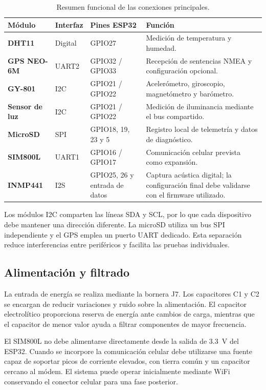 \documentclass[11pt,a4paper]{article}
\begin{document}
\begin{table}[H]
\centering
\caption{Resumen funcional de las conexiones principales.}
\begin{tabularx}{0.98\textwidth}{>{\bfseries}p{3.0cm} p{3.0cm} p{3.0cm} X}
\toprule
Módulo & Interfaz & Pines ESP32 & Función \\
\midrule
DHT11 & Digital & GPIO27 & Medición de temperatura y humedad. \\
GPS NEO-6M & UART2 & GPIO32 / GPIO33 & Recepción de sentencias NMEA y configuración opcional. \\
GY-801 & I2C & GPIO21 / GPIO22 & Acelerómetro, giroscopio, magnetómetro y barómetro. \\
Sensor de luz & I2C & GPIO21 / GPIO22 & Medición de iluminancia mediante el bus compartido. \\
MicroSD & SPI & GPIO18, 19, 23 y 5 & Registro local de telemetría y datos de diagnóstico. \\
SIM800L & UART1 & GPIO16 / GPIO17 & Comunicación celular prevista como expansión. \\
INMP441 & I2S & GPIO25, 26 y entrada de datos & Captura acústica digital; la configuración final debe validarse con el firmware utilizado. \\
\bottomrule
\end{tabularx}
\end{table}

Los módulos I2C comparten las líneas SDA y SCL, por lo que cada dispositivo debe mantener
una dirección diferente. La microSD utiliza un bus SPI independiente y el GPS emplea un
puerto UART dedicado. Esta separación reduce interferencias entre periféricos y facilita
las pruebas individuales.

\subsection{Alimentación y filtrado}

La entrada de energía se realiza mediante la bornera J7. Los capacitores C1 y C2 se
encargan de reducir variaciones y ruido sobre la alimentación. El capacitor electrolítico
proporciona reserva de energía ante cambios de carga, mientras que el capacitor de menor
valor ayuda a filtrar componentes de mayor frecuencia.

El SIM800L no debe alimentarse directamente desde la salida de \SI{3.3}{\volt} del ESP32.
Cuando se incorpore la comunicación celular debe utilizarse una fuente capaz de soportar
picos de corriente elevados, con tierra común y un capacitor cercano al módem. El sistema
puede operar inicialmente mediante WiFi conservando el conector celular para una fase
posterior.
\end{document}
